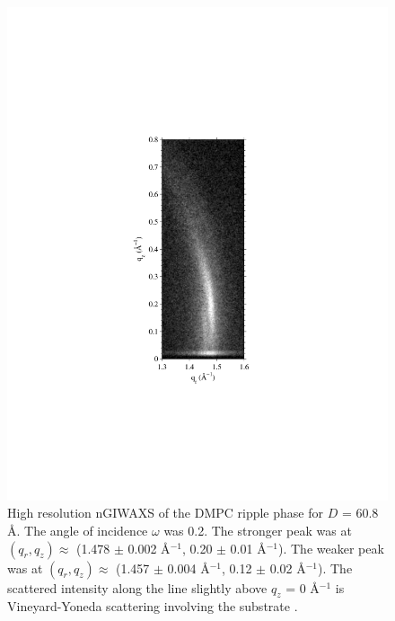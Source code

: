 \begin{figure}[htbp]
  \centering
  \includegraphics[trim=100 170 100 170,clip,width=\textwidth]{figures/ripple/nGIWAXS/dmpc1_enlarge}
  \caption{High resolution nGIWAXS of the DMPC ripple phase for $D$ = 60.8 \AA.
  The angle of incidence $\omega$ was 0.2\textdegree. The stronger peak was at
  $(q_r, q_z) \approx$ (1.478 $\pm$ 0.002 \AA$^{-1}$, 0.20 $\pm$ 0.01 \AA$^{-1}$). 
  The weaker peak was at 
  $(q_r, q_z) \approx$ (1.457 $\pm$ 0.004 \AA$^{-1}$, 0.12 $\pm$ 0.02 \AA$^{-1}$). The scattered
  intensity along the line slightly above $q_z$ = 0 \AA$^{-1}$ is Vineyard-Yoneda
  scattering involving the substrate \cite{ref:Vineyard82,ref:Miller08}.}
  \label{fig:nGIWAXS_enlarge}
\end{figure}

